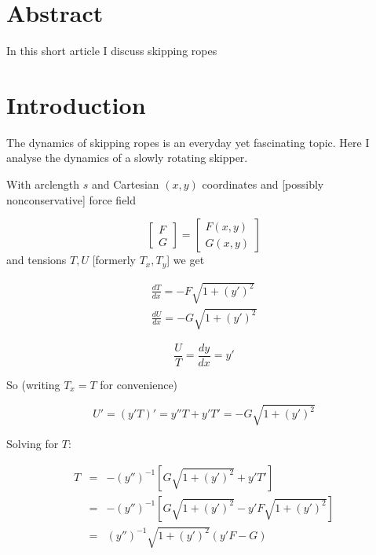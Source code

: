 \documentclass{article}
\begin{document}
\newcommand{\jj}{\sqrt{1+\left(y'\right)^2}}
\section*{Abstract}
In this short article I discuss skipping ropes



\section{Introduction}

The dynamics of skipping ropes is an everyday yet fascinating topic.
Here I analyse the dynamics of a slowly rotating skipper.



\citep{mohazzabi1999}


With arclength $s$ and Cartesian $(x,y)$ coordinates and [possibly
  nonconservative] force field

\begin{equation}
  \begin{bmatrix}F\\G\end{bmatrix}
    =
    \begin{bmatrix}F(x,y)\\G(x,y)\end{bmatrix}
\end{equation}
and tensions $T,U$ [formerly $T_x,T_y$] we get

\begin{eqnarray}
  \frac{dT}{dx}=-F\jj\label{Tx}\\
  \frac{dU}{dx}=-G\jj\label{Ty}
  \end{eqnarray}

\begin{equation}
  \frac{U}{T}=\frac{dy}{dx}=y'
\end{equation}

So (writing $T_x=T$ for convenience)

\begin{equation}
U'=(y'T)'=y''T+y'T'=-G\jj
\end{equation}

Solving for $T$:

\begin{eqnarray}
  T &=& -(y'')^{-1}\left[G\jj + y'T'\right]\nonumber\\
  &=& -(y'')^{-1}\left[G\jj -y'F\jj\right]\nonumber\\
    &=& (y'')^{-1}\jj(y'F-G)\label{eqforT}
\end{eqnarray}
\end{document}

